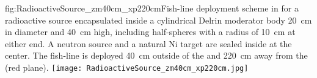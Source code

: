 \begin{dunefigure}{fig:RadioactiveSource_zm40cm_xp220cm}{Fish-line deployment scheme in  for a radioactive source encapsulated inside a cylindrical Delrin moderator body \SI{20}{\cm} in diameter and \SI{40}{\cm} high, including half-spheres with a radius of \SI{10}{\cm} at either end. A  neutron source and a natural Ni target are sealed inside at the center. The fish-line is deployed \SI{40}{\cm} outside of the  and \SI{220}{\cm} away from the  (red plane).}
\texttt{[image: RadioactiveSource\_zm40cm\_xp220cm.jpg]}
\end{dunefigure}




